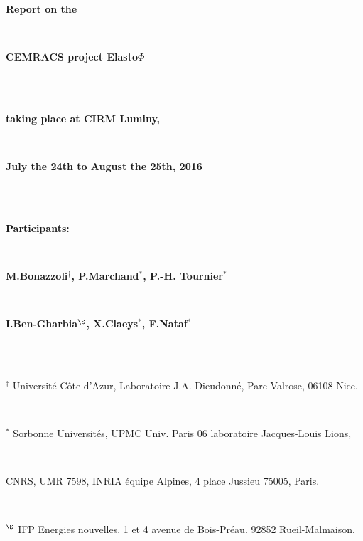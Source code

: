 
\thispagestyle{empty}

\centerline{\textbf{\huge Report on the}}
\quad\\[5pt]
\centerline{\textbf{\huge CEMRACS project Elasto$\Phi$}}
\quad\\[5pt]
\vspace{1cm}
\quad\\
\centerline{\textbf{\Large taking place at CIRM Luminy,}}\quad\\[5pt]
\centerline{\textbf{\Large July the 24th to August the 25th, 2016}}\quad\\[5pt]
\vspace{1cm}
\quad\\
\centerline{\textbf{\Large Participants:}}\quad\\[15pt]
\centerline{\textbf{\Large M.Bonazzoli$^{\dagger}$, P.Marchand$^{*}$, P.-H. Tournier$^{*}$}}\quad\\[5pt]
\centerline{\textbf{\Large I.Ben-Gharbia$^{\S}$, X.Claeys$^{*}$, F.Nataf$^{*}$}}\quad\\[5pt]
\vspace{0.25cm}\quad\\
\centerline{$^{\dagger}$ Université Côte d'Azur, Laboratoire J.A. Dieudonn\'e, Parc Valrose, 06108 Nice.}\,\\
\centerline{$^{*}$ Sorbonne Universités, UPMC Univ. Paris 06 laboratoire Jacques-Louis Lions,}\,\\
\centerline{CNRS, UMR 7598, INRIA équipe Alpines, 4 place Jussieu 75005, Paris.}\,\\
\centerline{$^{\S}$ IFP Energies nouvelles. 1 et 4 avenue de Bois-Pr\'eau. 92852 Rueil-Malmaison.}



